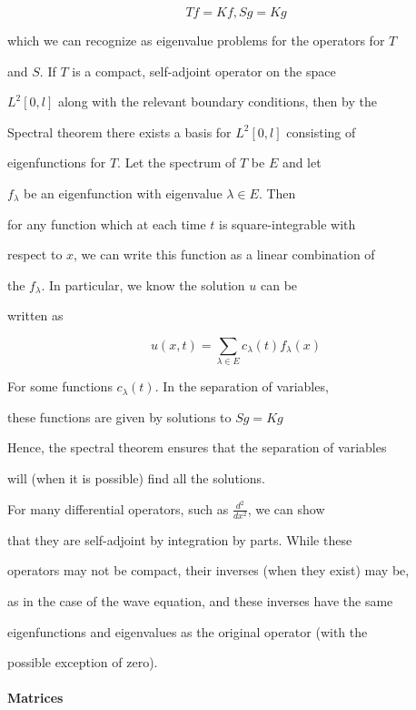 $$Tf = Kf, Sg = Kg$$



which we can recognize as eigenvalue problems for the operators for $T$

and $S$. If $T$ is a compact, self-adjoint operator on the space

$L^2[0,l]$ along with the relevant boundary conditions, then by the

Spectral theorem there exists a basis for $L^2[0,l]$ consisting of

eigenfunctions for $T$. Let the spectrum of $T$ be $E$ and let

$f_{\lambda}$ be an eigenfunction with eigenvalue $\lambda \in E$. Then

for any function which at each time $t$ is square-integrable with

respect to $x$, we can write this function as a linear combination of

the $f_{\lambda}$. In particular, we know the solution $u$ can be

written as



$$u(x,t) = \sum_{\lambda \in E} c_{\lambda}(t)f_{\lambda}(x)$$



For some functions $c_{\lambda}(t)$. In the separation of variables,

these functions are given by solutions to $Sg = Kg$



Hence, the spectral theorem ensures that the separation of variables

will (when it is possible) find all the solutions.



For many differential operators, such as $\frac{d^2}{dx^2}$, we can show

that they are self-adjoint by integration by parts. While these

operators may not be compact, their inverses (when they exist) may be,

as in the case of the wave equation, and these inverses have the same

eigenfunctions and eigenvalues as the original operator (with the

possible exception of zero).



\paragraph{Matrices}



